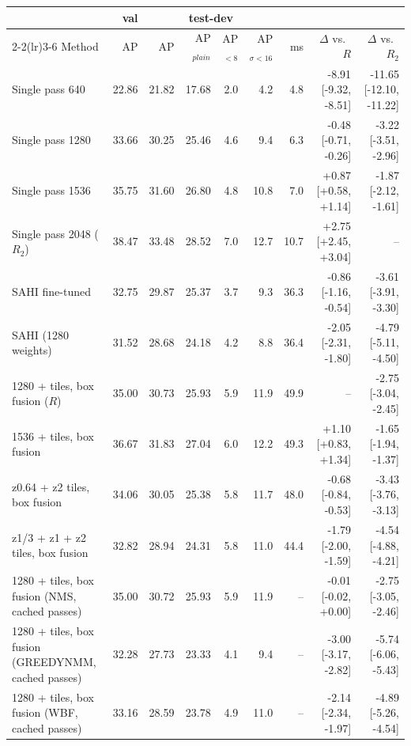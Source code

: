 \begin{tabular}{lrrrrrrrr}
\toprule
 & val & \multicolumn{4}{c}{test-dev} & & & \\ \cmidrule(lr){2-2}\cmidrule(lr){3-6}
Method & AP & AP & AP$_{plain}$ & AP$_{<8}$ & AP$_{\sigma<16}$ & ms & $\Delta$ vs.\ $R$ & $\Delta$ vs.\ $R_2$ \\
\midrule
Single pass 640 & 22.86 & 21.82 & 17.68 & 2.0 & 4.2 & 4.8 & -8.91 {\scriptsize[-9.32, -8.51]} & -11.65 {\scriptsize[-12.10, -11.22]} \\
Single pass 1280 & 33.66 & 30.25 & 25.46 & 4.6 & 9.4 & 6.3 & -0.48 {\scriptsize[-0.71, -0.26]} & -3.22 {\scriptsize[-3.51, -2.96]} \\
Single pass 1536 & 35.75 & 31.60 & 26.80 & 4.8 & 10.8 & 7.0 & +0.87 {\scriptsize[+0.58, +1.14]} & -1.87 {\scriptsize[-2.12, -1.61]} \\
Single pass 2048 ($R_2$) & 38.47 & 33.48 & 28.52 & 7.0 & 12.7 & 10.7 & +2.75 {\scriptsize[+2.45, +3.04]} & -- \\
SAHI fine-tuned & 32.75 & 29.87 & 25.37 & 3.7 & 9.3 & 36.3 & -0.86 {\scriptsize[-1.16, -0.54]} & -3.61 {\scriptsize[-3.91, -3.30]} \\
SAHI (1280 weights) & 31.52 & 28.68 & 24.18 & 4.2 & 8.8 & 36.4 & -2.05 {\scriptsize[-2.31, -1.80]} & -4.79 {\scriptsize[-5.11, -4.50]} \\
1280 + tiles, box fusion ($R$) & 35.00 & 30.73 & 25.93 & 5.9 & 11.9 & 49.9 & -- & -2.75 {\scriptsize[-3.04, -2.45]} \\
1536 + tiles, box fusion & 36.67 & 31.83 & 27.04 & 6.0 & 12.2 & 49.3 & +1.10 {\scriptsize[+0.83, +1.34]} & -1.65 {\scriptsize[-1.94, -1.37]} \\
z0.64 + z2 tiles, box fusion & 34.06 & 30.05 & 25.38 & 5.8 & 11.7 & 48.0 & -0.68 {\scriptsize[-0.84, -0.53]} & -3.43 {\scriptsize[-3.76, -3.13]} \\
z1/3 + z1 + z2 tiles, box fusion & 32.82 & 28.94 & 24.31 & 5.8 & 11.0 & 44.4 & -1.79 {\scriptsize[-2.00, -1.59]} & -4.54 {\scriptsize[-4.88, -4.21]} \\
1280 + tiles, box fusion (NMS, cached passes) & 35.00 & 30.72 & 25.93 & 5.9 & 11.9 & -- & -0.01 {\scriptsize[-0.02, +0.00]} & -2.75 {\scriptsize[-3.05, -2.46]} \\
1280 + tiles, box fusion (GREEDYNMM, cached passes) & 32.28 & 27.73 & 23.33 & 4.1 & 9.4 & -- & -3.00 {\scriptsize[-3.17, -2.82]} & -5.74 {\scriptsize[-6.06, -5.43]} \\
1280 + tiles, box fusion (WBF, cached passes) & 33.16 & 28.59 & 23.78 & 4.9 & 11.0 & -- & -2.14 {\scriptsize[-2.34, -1.97]} & -4.89 {\scriptsize[-5.26, -4.54]} \\

\end{tabular}
